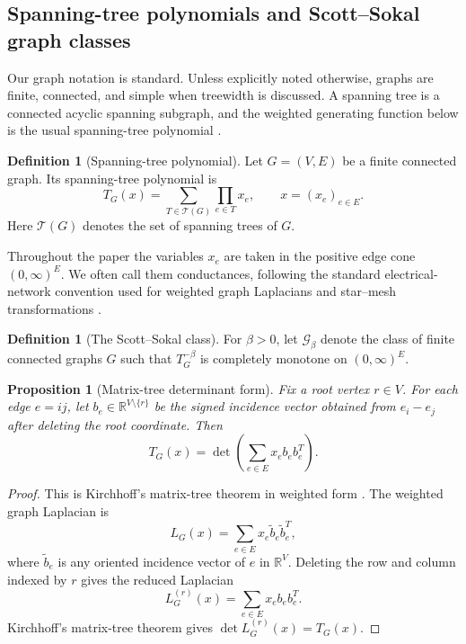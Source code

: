 \documentclass[preprint,12pt,authoryear]{elsarticle}
\numberwithin{equation}{section}
\newtheorem{proposition}[theorem]{Proposition}
\theoremstyle{definition}
\newtheorem{definition}[theorem]{Definition}
\theoremstyle{remark}
\newcommand{\R}{\mathbb{R}}
\newcommand{\calG}{\mathcal{G}}
\newcommand{\calT}{\mathcal{T}}
\newcommand{\1}{\mathbf{1}}
\begin{document}
\subsection{Spanning-tree polynomials and Scott--Sokal graph classes}

Our graph notation is standard.  Unless explicitly noted otherwise, graphs are finite, connected, and simple when treewidth is discussed.  A spanning tree is a connected acyclic spanning subgraph, and the weighted generating function below is the usual spanning-tree polynomial \cite{Bollobas1998,Bapat2010,SokalTutte}.

\begin{definition}[Spanning-tree polynomial]
Let $G=(V,E)$ be a finite connected graph.  Its spanning-tree polynomial is
\begin{equation}
        T_G(x)=\sum_{T\in\calT(G)}\prod_{e\in T}x_e,
        \qquad x=(x_e)_{e\in E}.
\end{equation}
Here $\calT(G)$ denotes the set of spanning trees of $G$.
\end{definition}

Throughout the paper the variables $x_e$ are taken in the positive edge cone $(0,\infty)^E$.  We often call them conductances, following the standard electrical-network convention used for weighted graph Laplacians and star--mesh transformations \cite{DoyleSnell1984,CurtisIngermanMorrow1998}.

\begin{definition}[The Scott--Sokal class]
For $\beta>0$, let $\calG_\beta$ denote the class of finite connected graphs $G$ such that $T_G^{-\beta}$ is completely monotone on $(0,\infty)^E$.
\end{definition}

\begin{proposition}[Matrix-tree determinant form]
\label{prop:matrix-tree}
Fix a root vertex $r\in V$.  For each edge $e=ij$, let $b_e\in\R^{V\setminus\{r\}}$ be the signed incidence vector obtained from $e_i-e_j$ after deleting the root coordinate.  Then
\begin{equation}
        T_G(x)=\det\left(\sum_{e\in E}x_e b_e b_e^T\right).
\end{equation}
\end{proposition}

\begin{proof}
This is Kirchhoff's matrix-tree theorem in weighted form \cite{Kirchhoff,Bapat2010}.  The weighted graph Laplacian is
\begin{equation}
        L_G(x)=\sum_{e\in E}x_e \widetilde b_e\widetilde b_e^T,
\end{equation}
where $\widetilde b_e$ is any oriented incidence vector of $e$ in $\R^V$.  Deleting the row and column indexed by $r$ gives the reduced Laplacian
\begin{equation}
        L_G^{(r)}(x)=\sum_{e\in E}x_e b_e b_e^T .
\end{equation}
Kirchhoff's matrix-tree theorem gives $\det L_G^{(r)}(x)=T_G(x)$.
\end{proof}
\end{document}
